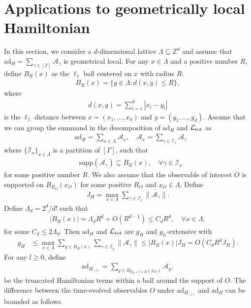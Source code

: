 \documentclass[11pt]{article}
\renewcommand{\L}{\mathcal{L}}
\newcommand{\ad}{\mathrm{ad}}
\newcommand{\A}{\mathcal{A}}
\newcommand{\supp}{\mathrm{supp}}
\newcommand{\mc}{\mathcal}
\begin{document}
\section{Applications to geometrically local Hamiltonian}
\label{sec:geo-local}
In this section, we consider a $d$-dimensional lattice $\Lambda \subseteq \mathbb{Z}^d$ and assume that $\ad_H = \sum_{\gamma\in [\Gamma]} \A_{\gamma}$ is geometrical local. 
For any $x\in \Lambda$ and a positive number $R$, define $B_R(x)$ as the $\ell_1$ ball centered on $x$ with radius $R$: \begin{align*}
    B_R(x) = \{ y\in \Lambda:d(x,y) \le R\},
\end{align*}
where \begin{align*}
    d(x,y) = \sum_{i=1}^d  |x_i-y_i|
\end{align*}
is the $\ell_1$ distance between $x = (x_1, \ldots, x_d)$ and $y= (y_1, \ldots, y_d)$. 
Assume that we can group the summand in the decomposition of $\ad_H$ and $\L_{\rm tot}$ as \begin{align*}
    &\ad_H = \sum_{x\in {\Lambda}} \A_x, \quad \A_x = \sum_{\gamma\in \mc I_x} \A_{\gamma} 
\end{align*} where $\{\mc I_x\}_{x\in \Lambda}$ is a partition of $[\Gamma]$, such that \begin{align*}
    &\supp(\A_{\gamma}) \subseteq B_R(x), \quad \forall \gamma\in \mc I_x
\end{align*} for some positive number $R$. We also assume that the observable of interest $O$ is supported on $B_{R_O}(x_O)$ for some positive $R_O$ and $x_O\in \Lambda$. Define \begin{align*}
    J_H = \max_{x\in \Lambda}\sum_{\gamma\in \mc I_x} \|\A_{\gamma}\|.
\end{align*} Define $\Lambda_d = 2^d/d!$ such that \begin{align*}
    |B_R(x)| = \Lambda_dR^d + O(R^{d-1})\le C_d R^d, \quad \forall x\in \Lambda,
\end{align*}
for some $C_d\le 2\Lambda_d$.
Then $\ad_H$ and $\L_{\rm tot}$ are $g_H$ and $g_L$-extensive with \begin{align*}
    g_H &\le \max_{x\in \Lambda} \sum_{y\in B_R(x)}\sum_{\gamma\in \mc I_y} \|\A_{\gamma}\|\le |B_R(x)|J_H  = O(C_d R^d J_H).
\end{align*}
For any $l \ge 0$, define\begin{align*}
    \ad_{H_{(l)}} = \sum_{y\in B_{R_O+l+R}(x_O)} \A_y,
\end{align*}
be the truncated Hamiltonian terms within a ball around the support of $O$. The difference between the time-evolved observables $O$ under $\ad_{H_{(l)}}$ and $ \ad_H$ can be bounded as follows. 
\end{document}
